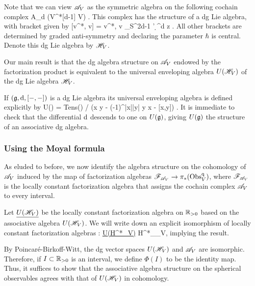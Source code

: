 \documentclass[10pt]{amsart}
\begin{document}
Note that we can view $\mathscr A_V$ as the symmetric algebra on the following cochain complex
\ben
A_d \tensor (V^*[d-1] \tensor V) \oplus \CC \cdot \hbar .
\een
This complex has the structure of a dg Lie algebra, with bracket given by
\be\label{HV bracket}
[\alpha \tensor v^*, \alpha \tensor v] = \hbar \<v^*, v\> \oint_{S^{2d-1}} \alpha \wedge \alpha'  \d^d z .
\ee
All other brackets are determined by graded anti-symmetry and declaring the parameter $\hbar$ is central.
Denote this dg Lie algebra by $\mathscr H_V$. 

Our main result is that the dg algebra structure on $\mathscr A_V$ endowed by the factorization product is equivalent to the universal enveloping algebra $U(\mathscr H_V)$ of the dg Lie algebra $\mathscr H_V$.

\begin{rmk}
If $(\mathfrak g, {\rm d}, [-,-])$ is a dg Lie algebra its universal enveloping algebra is defined explicitly by 
\ben
U(\fg) = {\rm Tens}(\fg) / (x \tensor y - (-1)^{|x||y|} y \tensor x - [x,y]) .
\een
It is immediate to check that the differential ${\rm d}$ descends to one on $U(\mathfrak g)$, giving $U(\mathfrak g)$ the structure of an associative dg algebra.
\end{rmk}

\subsubsection{Using the Moyal formula}

As eluded to before, we now identify the algebra structure on the cohomology of $\mathscr A_V$
induced by the map of factorization algebras $\mathscr F_{\mathscr A_V} \to \pi_*({\rm Obs}_V^{\rm q})$, where $\mathscr F_{\mathscr A_V}$ is the locally constant factorization algebra that assigns the cochain complex $\mathscr A_V$ to every interval.

Let $\underline{U(\mathscr H_V)}$ be the locally constant factorization algebra on $\mathbb R_{>0}$ based on the associative algebra $U(\mathscr H_V)$. 
We will write down an explicit isomorphism of locally constant factorization algebras
\ben
\Phi : \ul{U(H^*\sH_V)} \to H^*\sF_{\sA_V},
\een
implying the result. 

By Poincar\'{e}-Birkoff-Witt, the dg vector spaces $U(\mathscr H_V)$ and $\mathscr A_V$ are isomorphic. 
Therefore, if $I \subset \mathbb R_{>0}$ is an interval, we define $\Phi(I)$ to be the identity map. 
Thus, it suffices to show that the associative algebra structure on the spherical observables agrees with that of $U(\mathscr H_V)$ in cohomology.

\end{document}
